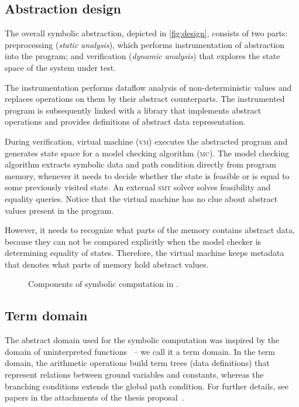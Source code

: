 \subsection{Abstraction design}

The overall symbolic abstraction, depicted in \autoref{fig:design}, consists of
two parts: preprocessing (\emph{static analysis}), which performs
instrumentation of abstraction into the program; and verification
(\emph{dynamic analysis}) that explores the state space of the system under
test.

The instrumentation performs dataflow analysis of non-de\-ter\-ministic values and
replaces operations on them by their abstract counterparts. The instrumented
program is subsequently linked with a library that implements abstract
operations and provides definitions of abstract data representation.

During verification, virtual machine (\textsc{vm}) executes the abs\-trac\-ted
program and generates state space for a model checking algorithm (\textsc{mc}).
The model checking algorithm extracts symbolic data and path condition directly
from program memory, whenever it needs to decide whether the state is feasible
or is equal to some previously visited state. An external \textsc{smt} solver solves
feasibility and equality queries. Notice that the virtual machine has no clue
about abstract values present in the program.

However, it needs to recognize what parts of the memory contains abstract data,
because they can not be compared explicitly when the model checker is
determining equality of states. Therefore, the virtual machine keeps metadata
that denotes what parts of memory hold abstract values.

\begin{figure}
    \centering
    
    \caption{Components of symbolic computation in \divine.}
    \label{fig:design}
\end{figure}

\subsection{Term domain}

The abstract domain used for the symbolic computation was inspired by the
domain of uninterpreted functions~\cite{Gange2016} -- we call it a term domain.
In the term domain, the arithmetic operations build term trees (data
definitions) that represent relations between ground variables and constants,
whereas the branching conditions extends the global path condition.  For
further details, see papers in the attachments of the thesis
proposal~\cite{Lauko2018SymComp, Lauko2019Sym}.

